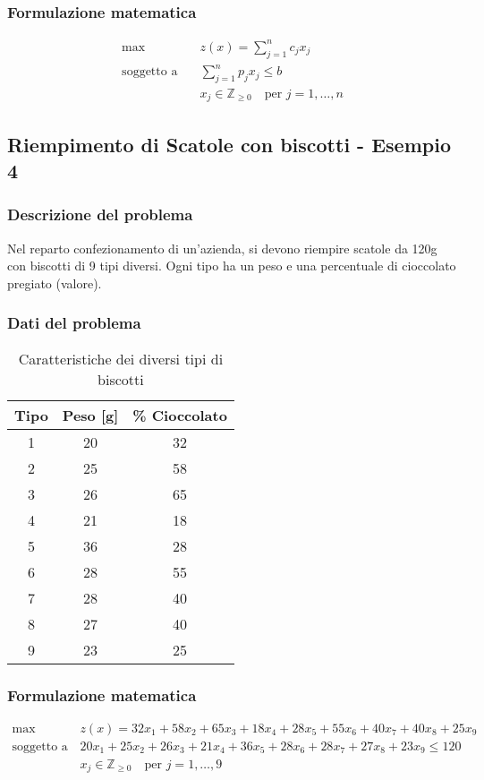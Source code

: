 \subsubsection{Formulazione matematica}
\[
\begin{aligned}
\max \quad & z(x) = \sum_{j=1}^{n} c_j x_j \\
\text{soggetto a} \quad & \sum_{j=1}^{n} p_j x_j \leq b \\
& x_j \in \mathbb{Z}_{\geq 0} \quad \text{per } j = 1, \dots, n
\end{aligned}
\]

\subsection{Riempimento di Scatole con biscotti - Esempio 4}
\subsubsection{Descrizione del problema}
Nel reparto confezionamento di un'azienda, si devono riempire scatole da 120g con 
biscotti di 9 tipi diversi. Ogni tipo ha un peso e una percentuale di cioccolato pregiato (valore).

\subsubsection{Dati del problema}
\begin{table}[htbp]
    \centering
    \caption{Caratteristiche dei diversi tipi di biscotti}
    \begin{tabular}{|c|c|c|}
        \hline
        \textbf{Tipo} & \textbf{Peso [g]} & \textbf{\% Cioccolato} \\
        \hline
        1 & 20 & 32 \\
        2 & 25 & 58 \\
        3 & 26 & 65 \\
        4 & 21 & 18 \\
        5 & 36 & 28 \\
        6 & 28 & 55 \\
        7 & 28 & 40 \\
        8 & 27 & 40 \\
        9 & 23 & 25 \\
        \hline
    \end{tabular}
\end{table}

\subsubsection{Formulazione matematica}
\[
\begin{aligned}
\max \quad & z(x) = 32x_1 + 58x_2 + 65x_3 + 18x_4 + 28x_5 + 55x_6 + 40x_7 + 40x_8 + 25x_9 \\
\text{soggetto a} \quad & 20x_1 + 25x_2 + 26x_3 + 21x_4 + 36x_5 + 28x_6 + 28x_7 + 27x_8 + 23x_9 \leq 120 \\
& x_j \in \mathbb{Z}_{\geq 0} \quad \text{per } j = 1, \dots, 9
\end{aligned}
\]

